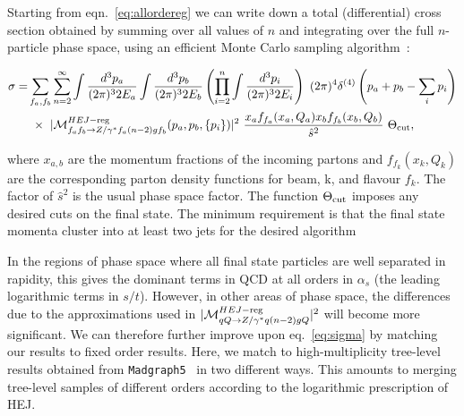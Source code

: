 	Starting from eqn.~\eqref{eq:allordereg} we can write down a total (differential)
	cross section obtained by summing over all values of $n$ and
	integrating over the full $n$-particle phase space, using an efficient Monte
	Carlo sampling algorithm~\cite{Andersen:2008ue,Andersen:2008gc}:

	\begin{align}
	  \label{eq:sigma}
	  \begin{split}
	    \sigma =& \sum_{f_a,f_b} \sum_{n=2}^\infty \int \frac{d^3 p_a}{(2\pi)^3 2E_a} \int \frac{d^3
	      p_b}{(2\pi)^3 2E_b}  \left( \prod_{i=2}^n \int \frac{d^3 p_i}{(2\pi)^3
	        2E_i} \right)\ (2\pi)^4 \delta^{(4)}\left(p_a+p_b - \sum_i p_i\right) \\
	    & \ \times \ |\mathcal{M}^{HEJ-{\rm reg}}_{f_af_b\to Z/\gamma^*
	      f_a(n-2)gf_b}(p_a,p_b,\{p_i\})|^2 \ \frac{ x_a f_{f_a}(x_a, Q_a) x_b
	      f_{f_b}(x_b,Q_b)}{\hat s^2}\ \Theta_{\rm cut},
	  \end{split}
	\end{align}

	where $x_{a,b}$ are the momentum fractions of the incoming partons and
	$f_{f_k}(x_k,Q_k)$ are the corresponding parton density functions for beam,
	k, and flavour $f_k$.  The factor of $\hat s^2$ is the usual phase space
	factor.  The function $\Theta_{\rm cut}$ imposes any desired cuts on the final
	state.  The minimum requirement is that the final state momenta cluster into at
	least two jets for the desired algorithm

	In the regions of phase space where all final state particles are well separated
	in rapidity, this gives the dominant terms in QCD at all orders in $\alpha_s$  (the leading logarithmic
	terms in $s/t$).  However, in other areas of
	phase space, the differences due to the approximations used in
	$|\mathcal{M}^{HEJ-{\rm reg}}_{qQ\to Z/\gamma^* q(n-2)gQ}|^2$ will become more
	significant.  We can therefore further improve upon eq.~\eqref{eq:sigma} by
	matching our results to fixed order results.  Here, we match to
	high-multiplicity tree-level
	results obtained from \texttt{Madgraph5}~\cite{Alwall:2014hca} in two different ways.
	This amounts to merging tree-level samples of different orders according to the
	logarithmic prescription of HEJ.

